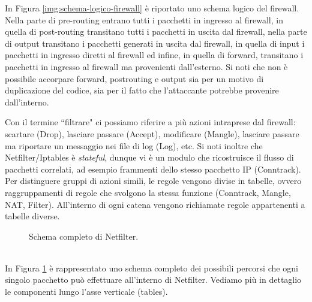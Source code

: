 In Figura \ref{img:schema-logico-firewall} è riportato uno schema logico del firewall. Nella parte di pre-routing entrano tutti i pacchetti in ingresso al firewall, in quella di post-routing transitano tutti i pacchetti in uscita dal firewall, nella parte di output transitano i pacchetti generati in uscita dal firewall, in quella di input i pacchetti in ingresso diretti al firewall ed infine, in quella di forward, transitano i pacchetti in ingresso al firewall ma provenienti dall'esterno. Si noti che non è possibile accorpare forward, postrouting e output sia per un motivo di duplicazione del codice, sia per il fatto che l'attaccante potrebbe provenire dall'interno.

Con il termine \textquotedblleft filtrare" ci possiamo riferire a più azioni intraprese dal firewall: scartare (Drop), lasciare passare (Accept), modificare (Mangle), lasciare passare ma riportare un messaggio nei file di log (Log), etc. Si noti inoltre che Netfilter/Iptables è \textit{stateful}, dunque vi è un modulo che ricostruisce il flusso di pacchetti correlati, ad esempio frammenti dello stesso pacchetto IP (Conntrack). Per distinguere gruppi di azioni simili, le regole vengono divise in tabelle, ovvero raggruppamenti di regole che svolgono la stessa funzione (Conntrack, Mangle, NAT, Filter). All'interno di ogni catena vengono richiamate regole appartenenti a tabelle diverse.
\begin{figure}
	\caption{Schema completo di Netfilter.}
	\label{img:nfk-traversal}
\end{figure}\\
In Figura \ref{img:nfk-traversal} è rappresentato uno schema completo dei possibili percorsi che ogni singolo pacchetto può effettuare all'interno di Netfilter. Vediamo più in dettaglio le componenti lungo l'asse verticale (tables).

